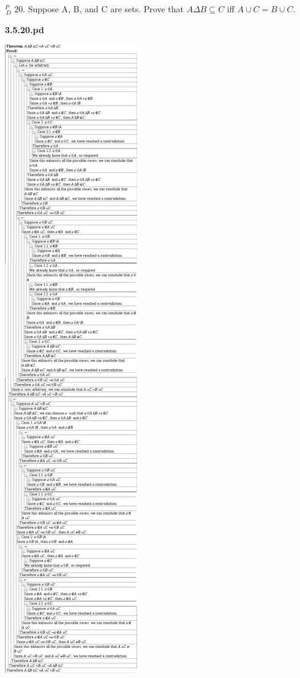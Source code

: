 \documentclass{article}
\begin{document}
\vspace{30pt}

$^{\textit{P}}_{\, \textit{D}}$ 20. Suppose A, B, and C are sets. Prove that $A \Delta B \subseteq C$ iff $A \cup C = B \cup C$.

\vspace{30pt}

\textbf{3.5.20.pd}
\vspace{10pt}

\includegraphics[scale=0.08]{3_5_20}
\end{document}
